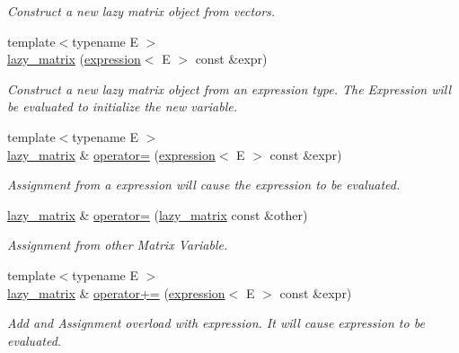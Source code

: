 \begin{DoxyCompactItemize}
\begin{DoxyCompactList}\small\item\em Construct a new lazy matrix object from vectors. \end{DoxyCompactList}\item 
{\footnotesize template$<$typename E $>$ }\\\mbox{\hyperlink{classboost_1_1test_1_1lazy__matrix_a11af68d859c54c6caa37b44d7a77d48b}{lazy\+\_\+matrix}} (\mbox{\hyperlink{classboost_1_1test_1_1expression}{expression}}$<$ E $>$ const \&expr)
\begin{DoxyCompactList}\small\item\em Construct a new lazy matrix object from an expression type. The Expression will be evaluated to initialize the new variable. \end{DoxyCompactList}\item 
{\footnotesize template$<$typename E $>$ }\\\mbox{\hyperlink{classboost_1_1test_1_1lazy__matrix}{lazy\+\_\+matrix}} \& \mbox{\hyperlink{classboost_1_1test_1_1lazy__matrix_abd458b7f3964d5682af566f4199e1411}{operator=}} (\mbox{\hyperlink{classboost_1_1test_1_1expression}{expression}}$<$ E $>$ const \&expr)
\begin{DoxyCompactList}\small\item\em Assignment from a expression will cause the expression to be evaluated. \end{DoxyCompactList}\item 
\mbox{\hyperlink{classboost_1_1test_1_1lazy__matrix}{lazy\+\_\+matrix}} \& \mbox{\hyperlink{classboost_1_1test_1_1lazy__matrix_a2435aa9a75d9edc38619f1c4fb8682f4}{operator=}} (\mbox{\hyperlink{classboost_1_1test_1_1lazy__matrix}{lazy\+\_\+matrix}} const \&other)
\begin{DoxyCompactList}\small\item\em Assignment from other Matrix Variable. \end{DoxyCompactList}\item 
{\footnotesize template$<$typename E $>$ }\\\mbox{\hyperlink{classboost_1_1test_1_1lazy__matrix}{lazy\+\_\+matrix}} \& \mbox{\hyperlink{classboost_1_1test_1_1lazy__matrix_a7bf359d0c31a092abca0ce8b26bf34ef}{operator+=}} (\mbox{\hyperlink{classboost_1_1test_1_1expression}{expression}}$<$ E $>$ const \&expr)
\begin{DoxyCompactList}\small\item\em Add and Assignment overload with expression. It will cause expression to be evaluated. \end{DoxyCompactList}\item 

\end{DoxyCompactItemize}

